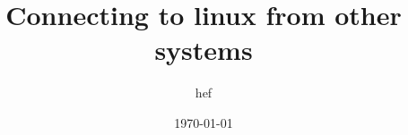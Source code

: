 \documentclass{beamer}
\title{Connecting to linux from other systems}
\author{hef}
\date{\today}
\begin{document}
\frame{\titlepage}
\section[outline]{}
\frame{\tableofcontents}
\end{document}
